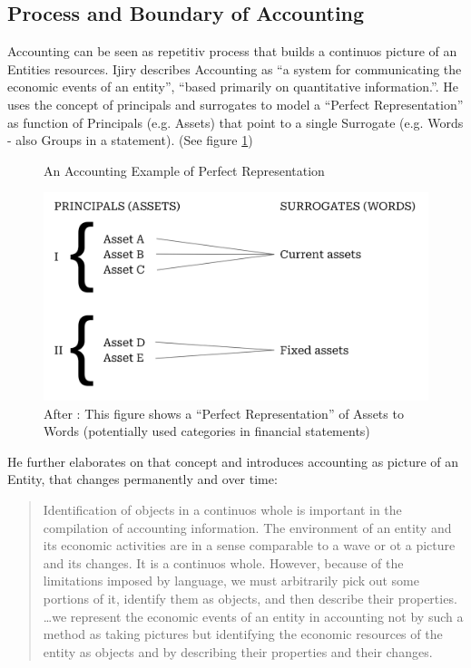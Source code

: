 \subsection{Process and Boundary of Accounting}\label{sec:Finacc-Process}

Accounting can be seen as repetitiv process that builds a continuos picture of an Entities resources.
Ijiry describes Accounting as \enquote{a system for communicating the economic events of an entity}, \enquote{based primarily on quantitative information.}\cite[p.3]{Ijiri1967}.
He uses the concept of principals and surrogates to model a \enquote{Perfect Representation} as function of Principals (e.g. Assets) that point to a single Surrogate (e.g. Words - also Groups in a statement). (See figure \ref{fig:accounting-fundamental-representation}) 

\begin{figure}
	\centering
	\caption{An Accounting Example of Perfect Representation}
	\label{fig:accounting-fundamental-representation}
	\includegraphics[width=0.7\linewidth]{"../figures/01 Ijiri Perfect Representation"}
	\caption*{After \cite[p.12]{Ijiri1967}: This figure shows a \enquote{Perfect Representation} of Assets to Words (potentially used categories in financial statements)} 
\end{figure}

He further elaborates on that concept and introduces accounting as picture of an Entity, that changes permanently and over time\cite[p.16]{Ijiri1967}:
\blockquote{Identification of objects in a continuos whole is important in the compilation of accounting information.
The environment of an entity and its economic activities are in a sense comparable to a wave or ot a picture and its changes.
It is a continuos whole.
However, because of the limitations imposed by language, we must arbitrarily pick out some portions of it, identify them as objects, and then describe their properties.
\dots we represent the economic events of an entity in accounting not by such a method as taking pictures but identifying the economic resources of the entity as objects and by describing their properties and their changes.}



